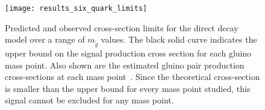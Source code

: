 \begin{figure}[!ht]
    \centering
    \texttt{[image: results\_six\_quark\_limits]}
    \caption{Predicted and observed cross-section limits for the direct decay model over a range of $m_{\tilde{g}}$ values.
    The black solid curve indicates the upper bound on the signal production cross section for each gluino mass point.
    Also shown are the estimated gluino pair production cross-sections at each mass point~\cite{paper-plb}.
    Since the theoretical cross-section is smaller than the upper bound for every mass point studied, this signal cannot be excluded for any mass point.
    }
\label{fig:results_six_quark_limits}
\end{figure}
